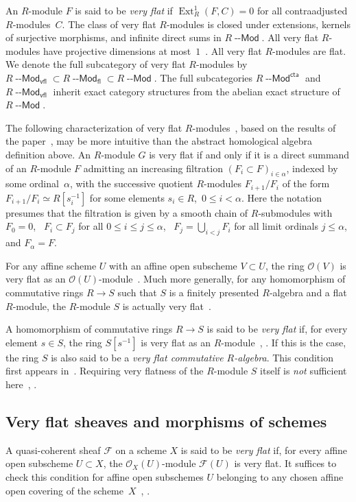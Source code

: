 \documentclass[12pt,a4paper]{amsart}
\newcommand{\+}{\protect\nobreakdash-}
\renewcommand{\:}{\colon}
\newcommand{\rarrow}{\longrightarrow}
\DeclareMathOperator{\Ext}{Ext}
\newcommand{\Modl}{{\operatorname{\mathsf{--Mod}}}}
\newcommand{\fl}{\mathsf{fl}}
\newcommand{\vfl}{\mathsf{vfl}}
\newcommand{\cta}{\mathsf{cta}}
\newcommand{\cO}{\mathcal O}
\newcommand{\cF}{\mathcal F}
\theoremstyle{plain}
\theoremstyle{definition}
\begin{document}
 An $R$\+module $F$ is said to be \emph{very flat} if
$\Ext^1_R(F,C)=0$ for all contraadjusted $R$\+modules~$C$.
 The class of very flat $R$\+modules is closed under extensions,
kernels of surjective morphisms, and infinite direct sums in
$R\Modl$.
 All very flat $R$\+modules have projective dimensions at most~$1$
\,\cite[Section~1.1]{Pcosh}.
 All very flat $R$\+modules are flat.
 We denote the full subcategory of very flat $R$\+modules by
$R\Modl_\vfl\subset R\Modl_\fl\subset R\Modl$.
 The full subcategories $R\Modl^\cta$ and $R\Modl_\vfl$ inherit
exact category structures from the abelian exact structure of $R\Modl$.

 The following characterization of very flat
$R$\+modules~\cite[Corollary~1.1.4]{Pcosh}, based on the results of
the paper~\cite{ET}, may be more intuitive than the abstract
homological algebra definition above.
 An $R$\+module $G$ is very flat if and only if it is a direct
summand of an $R$\+module $F$ admitting an increasing filtration
$(F_i\subset F)_{i\in\alpha}$, indexed by some ordinal~$\alpha$,
with the successive quotient $R$\+modules $F_{i+1}/F_i$ of the form
$F_{i+1}/F_i\simeq R[s_i^{-1}]$ for some elements $s_i\in R$,
\,$0\le i<\alpha$.
 Here the notation presumes that the filtration is given by
a smooth chain of $R$\+submodules with $F_0=0$, \
$F_i\subset F_j$ for all $0\le i\le j\le\alpha$,
\ $F_j=\bigcup_{i<j}F_i$ for all limit ordinals $j\le\alpha$,
and $F_\alpha=F$.

 For any affine scheme $U$ with an affine open subscheme $V\subset U$,
the ring $\cO(V)$ is very flat as
an $\cO(U)$\+module~\cite[Lemma~1.2.4]{Pcosh}.
 Much more generally, for any homomorphism of commutative rings
$R\rarrow S$ such that $S$ is a finitely presented $R$\+algebra
and a flat $R$\+module, the $R$\+module $S$ is actually very
flat~\cite[Main Theorem~1.1]{PSl1}.

 A homomorphism of commutative rings $R\rarrow S$ is said to be
\emph{very flat} if, for every element $s\in S$, the ring $S[s^{-1}]$
is very flat as an $R$\+module~\cite[Section~9]{PSl1},
\cite[Section~6.1]{Pphil}.
 If this is the case, the ring $S$ is also said to be
a \emph{very flat commutative $R$\+algebra}.
 This condition first appears in~\cite[Lemma~1.2.3]{Pcosh}.
 Requiring very flatness of the $R$\+module $S$ itself is \emph{not}
sufficient here~\cite[Example~9.7]{PSl1}, \cite[Section~6.1]{Pphil}.

\subsection{Very flat sheaves and morphisms of schemes}
 A quasi-coherent sheaf $\cF$ on a scheme $X$ is said to be
\emph{very flat} if, for every affine open subscheme $U\subset X$,
the $\cO_X(U)$\+module $\cF(U)$ is very flat.
 It suffices to check this condition for affine open subschemes $U$
belonging to any chosen affine open covering of the scheme~$X$
\,\cite[Lemma~1.2.6(a) and Section~1.10]{Pcosh},
\cite[Example~2.5]{Pal}.
\end{document}
